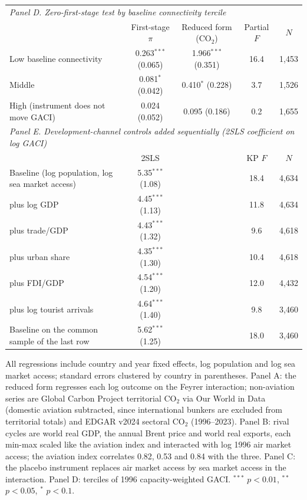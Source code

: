 \documentclass[12pt]{article}
\begin{document}
\begin{table}[H]
{\begin{threeparttable}
\begin{tabular}{lcccc}
\midrule
\multicolumn{5}{l}{\textit{Panel D. Zero-first-stage test by baseline connectivity tercile}} \\
 & First-stage $\pi$ & Reduced form (CO$_2$) & Partial $F$ & $N$ \\
  Low baseline connectivity & 0.263$^{***}$ (0.065) & 1.966$^{***}$ (0.351) & 16.4 & 1,453 \\
  Middle & 0.081$^{*}$ (0.042) & 0.410$^{*}$ (0.228) & 3.7 & 1,526 \\
  High (instrument does not move GACI) & 0.024 (0.052) & 0.095 (0.186) & 0.2 & 1,655 \\
\midrule
\multicolumn{5}{l}{\textit{Panel E. Development-channel controls added sequentially (2SLS coefficient on log GACI)}} \\
 & 2SLS & & KP $F$ & $N$ \\
  Baseline (log population, log sea market access) & 5.35$^{***}$ (1.08) & & 18.4 & 4,634 \\
  \quad plus log GDP & 4.45$^{***}$ (1.13) & & 11.8 & 4,634 \\
  \quad plus trade/GDP & 4.43$^{***}$ (1.32) & & 9.6 & 4,618 \\
  \quad plus urban share & 4.35$^{***}$ (1.30) & & 10.4 & 4,618 \\
  \quad plus FDI/GDP & 4.54$^{***}$ (1.20) & & 12.0 & 4,432 \\
  \quad plus log tourist arrivals & 4.64$^{***}$ (1.40) & & 9.8 & 3,460 \\
  Baseline on the common sample of the last row & 5.62$^{***}$ (1.25) & & 18.0 & 3,460 \\
\bottomrule
\end{tabular}
\begin{tablenotes}\scriptsize
\item All regressions include country and year fixed effects, log population and log sea market access; standard errors clustered by country in parentheses. Panel A: the reduced form regresses each log outcome on the Feyrer interaction; non-aviation series are Global Carbon Project territorial CO$_2$ via Our World in Data (domestic aviation subtracted, since international bunkers are excluded from territorial totals) and EDGAR v2024 sectoral CO$_2$ (1996--2023). Panel B: rival cycles are world real GDP, the annual Brent price and world real exports, each min-max scaled like the aviation index and interacted with log 1996 air market access; the aviation index correlates 0.82, 0.53 and 0.84 with the three. Panel C: the placebo instrument replaces air market access by sea market access in the interaction. Panel D: terciles of 1996 capacity-weighted GACI. $^{***}$ $p<0.01$, $^{**}$ $p<0.05$, $^{*}$ $p<0.1$.
\end{tablenotes}
\end{threeparttable}}
\end{table}
\end{document}

